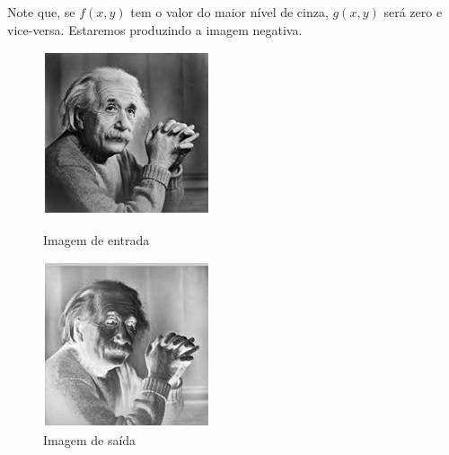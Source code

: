 \documentclass[a4paper, 12pt]{article}
\begin{document}
\begin{enumerate}
	Note que, se $f(x, y)$ tem o valor do maior nível de cinza, $g(x,y)$ será zero e vice-versa. Estaremos produzindo a imagem negativa.
	\begin{figure}[!htb]
		\centering
		  \includegraphics[width=\linewidth]{images/einstein256.jpg}
		  \caption{Imagem de entrada}
		\endminipage\hspace{1cm}
		  \includegraphics[scale=0.62]{images/graylevel4.jpg}
		  \caption{Imagem de saída}
		\endminipage
	\end{figure}
\end{enumerate}
\end{document}
